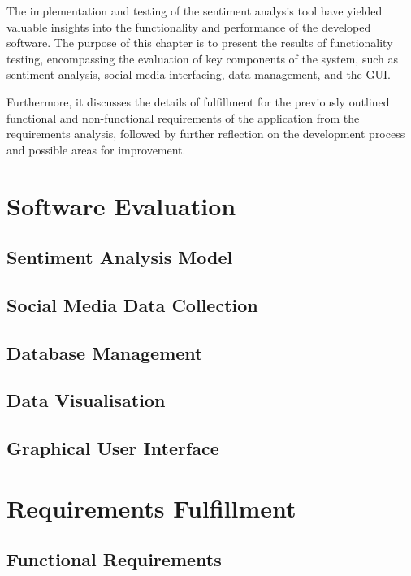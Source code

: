 The implementation and testing of the sentiment analysis tool \citep{sentimentanalysistool} have yielded valuable insights into the functionality and performance of the developed software. The purpose of this chapter is to present the results of functionality testing, encompassing the evaluation of key components of the system, such as sentiment analysis, social media interfacing, data management, and the GUI.

Furthermore, it discusses the details of fulfillment for the previously outlined functional and non-functional requirements of the application from the requirements analysis, followed by further reflection on the development process and possible areas for improvement.

\section{Software Evaluation}

    \subsection{Sentiment Analysis Model}

    \subsection{Social Media Data Collection}

    \subsection{Database Management}

    \subsection{Data Visualisation}

    \subsection{Graphical User Interface}

\section{Requirements Fulfillment}

    \subsection{Functional Requirements}

